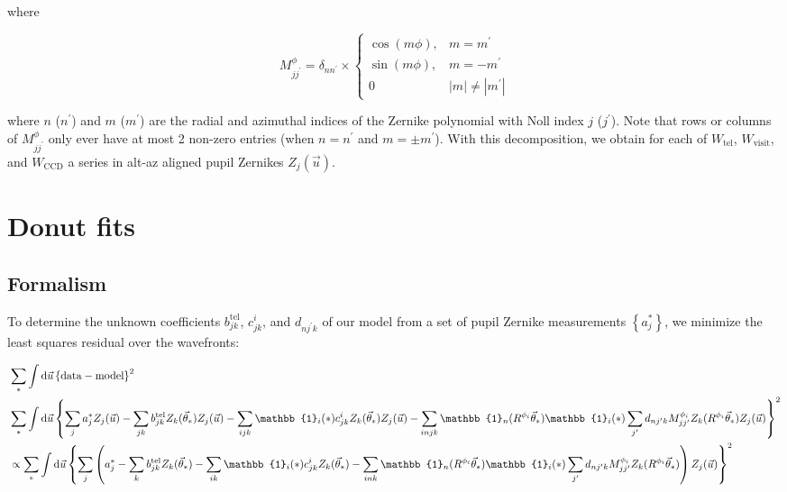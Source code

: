 \documentclass{article}
\begin{document}
where

\begin{equation}
    M_{j j^\prime}^\phi = \delta_{n n^\prime} \times \begin{cases}
    \cos(m \phi), & m = m^\prime \\
    \sin(m \phi), & m = -m^\prime \\
    0 & |m| \ne |m^\prime|
\end{cases}
\end{equation}

where $n$ ($n^\prime$) and $m$ ($m^\prime$) are the radial and azimuthal indices
of the Zernike polynomial with Noll index $j$ ($j^\prime$).  Note that rows or
columns of $M^\phi_{j j^\prime}$ only ever have at most 2 non-zero entries (when
$n = n^\prime$ and $m = \pm m^\prime$).  With this decomposition, we obtain
for each of $W_\mathrm{tel}$, $W_\mathrm{visit}$, and $W_\mathrm{CCD}$ a series
in alt-az aligned pupil Zernikes $Z_j(\vec{u})$.

\section{Donut fits}

\subsection{Formalism}

To determine the unknown coefficients $b^\mathrm{tel}_{jk}$, $c^i_{jk}$, and
$d_{n j^\prime k}$ of our model from a set of pupil Zernike measurements
$\left\{a^*_j\right\}$, we minimize the least squares residual over the
wavefronts:

\begin{equation}
\begin{align}
    &\sum_{\ast} \int \dif{\vec{u}} \left\{\mathrm{data} - \mathrm{model}\right\}^2 \\
    &\sum_{\ast}
    \int \dif{\vec{u}} \left\{\sum_j a_j^\ast Z_j(\vec{u})
    - \sum_{jk} b^\mathrm{tel}_{jk} Z_k(\vec{\theta}_\ast) Z_j(\vec{u})
    - \sum_{ijk} \mathbb{1}_i(\ast) c^i_{jk} Z_k(\vec{\theta}_\ast) Z_j(\vec{u})
    - \sum_{injk} \mathbb{1}_n(R^{\phi_i} \vec{\theta}_\ast) \mathbb{1}_i(\ast) \sum_{j^\prime} d_{n j^\prime k} M^{\phi_i}_{j j^\prime} Z_k(R^{\phi_i} \vec{\theta}_\ast) Z_j(\vec{u})
    \right\}^2 \\
    &\propto \sum_{\ast}
    \int \dif{\vec{u}} \left\{\sum_j\left(a_j^\ast
    - \sum_{k} b^\mathrm{tel}_{jk} Z_k(\vec{\theta}_\ast)
    - \sum_{ik} \mathbb{1}_i(\ast) c^i_{jk} Z_k(\vec{\theta}_\ast)
    - \sum_{ink} \mathbb{1}_n(R^{\phi_i} \vec{\theta}_\ast) \mathbb{1}_i(\ast) \sum_{j^\prime} d_{n j^\prime k} M^{\phi_i}_{j j^\prime} Z_k(R^{\phi_i} \vec{\theta}_\ast)
    \right) Z_j(\vec{u})\right\}^2 \\
\end{align}
\end{equation}
\end{document}
